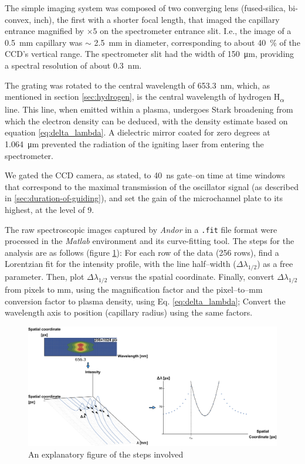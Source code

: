 \documentclass[../main.tex]{subfiles}
\begin{document}
The simple imaging system was composed of two converging lens (fused-silica, bi-convex,  inch), the first with a shorter focal length, that imaged the capillary entrance magnified by $\times 5$ on the spectrometer entrance slit. I.e., the image of a \SI{0.5}{\mm} capillary was $\sim$ \SI{2.5}{\mm} in diameter, corresponding to about \SI{40}{\percent} of the CCD's vertical range. The spectrometer slit had the width of \SI{150}{\micro\metre}, providing a spectral resolution of about \SI{0.3}{\nm}.

The grating was rotated to the central wavelength of \SI{653.3}{\nm}, which, as mentioned in section \ref{sec:hydrogen}, is the central wavelength of hydrogen H\textsubscript{$\alpha$} line. This line, when emitted within a plasma, undergoes Stark broadening from which the electron density can be deduced, with the density estimate based on equation \ref{eq:delta_lambda}. A dielectric mirror coated for zero degrees at \SI{1.064}{\um} prevented the radiation of the igniting laser from entering the spectrometer.

We gated the CCD camera, as stated, to \SI{40}{\ns} gate--on time at time windows that correspond to the maximal transmission of the oscillator signal (as described in \ref{sec:duration-of-guiding}), and set the gain of the microchannel plate to its highest, at the level of 9.

The raw spectroscopic images captured by \textit{Andor} in a \texttt{.fit} file format were processed in the \textit{Matlab} environment and its curve-fitting tool. The steps for the analysis are as follows (figure \ref{fig:spectra_analysis}): For each row of the data (256 rows), find a Lorentzian fit for the intensity profile, with the line half--width ($\Delta\lambda_{1/2}$) as a free parameter. Then, plot $\Delta\lambda_{1/2}$ versus the spatial coordinate. Finally, convert $\Delta\lambda_{1/2}$ from pixels to \si{\mm}, using the magnification factor and the pixel--to--mm conversion factor to plasma density, using Eq. \ref{eq:delta_lambda}; Convert the wavelength axis to position (capillary radius) using the same factors.
\begin{figure}
    \centering
    \includegraphics[width=\textwidth]{figures/spectro/spectra_analysis.pdf}
    \caption{An explanatory figure of the steps involved}
    \label{fig:spectra_analysis}
\end{figure}
\end{document}
